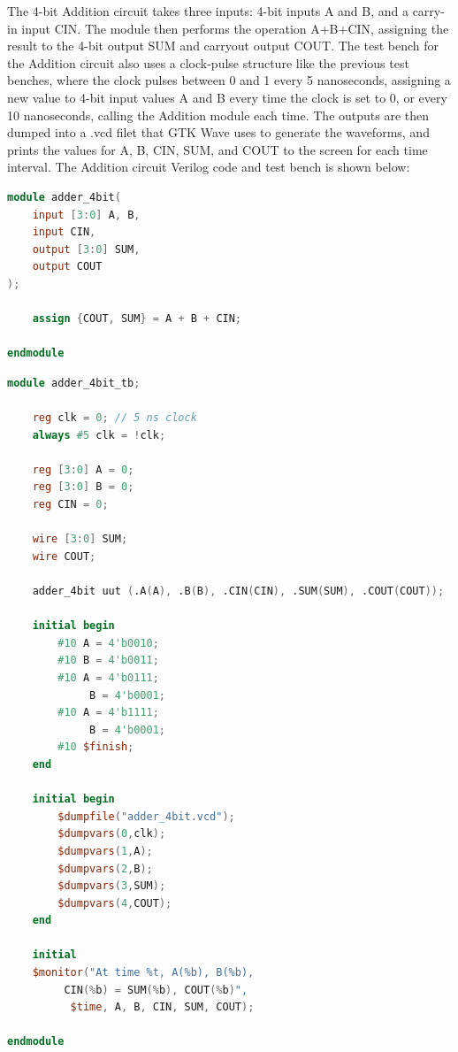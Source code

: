 \documentclass[runningheads, 12pt]{report}
\begin{document}
	The 4-bit Addition circuit takes three inputs: 4-bit inputs A and B, and a carry-in input CIN. The module then performs the operation A+B+CIN, assigning the result to the 4-bit output SUM and carryout output COUT.  The test bench for the Addition circuit also uses a clock-pulse structure like the previous test benches, where the clock pulses between 0 and 1 every 5 nanoseconds, assigning a new value to 4-bit input values A and B every time the clock is set to 0, or every 10 nanoseconds, calling the Addition module each time. The outputs are then dumped into a .vcd filet that GTK Wave uses to generate the waveforms, and prints the values for A, B, CIN, SUM, and COUT to the screen for each time interval. The Addition circuit Verilog code and test bench is shown below: 

\begin{lstlisting}[language=Verilog, caption={Addition Circuit Verilog}]
module adder_4bit(
    input [3:0] A, B,
    input CIN,
    output [3:0] SUM,
    output COUT
);

    assign {COUT, SUM} = A + B + CIN;

endmodule
\end{lstlisting}
	
\begin{lstlisting}[language=Verilog, caption={Addition Circuit Test Bench}]
module adder_4bit_tb;

    reg clk = 0; // 5 ns clock
    always #5 clk = !clk;

    reg [3:0] A = 0;
    reg [3:0] B = 0;
    reg CIN = 0;

    wire [3:0] SUM;
    wire COUT;

    adder_4bit uut (.A(A), .B(B), .CIN(CIN), .SUM(SUM), .COUT(COUT));

    initial begin
        #10 A = 4'b0010;
        #10 B = 4'b0011;
        #10 A = 4'b0111;
             B = 4'b0001;
        #10 A = 4'b1111;
             B = 4'b0001;
        #10 $finish;
    end

    initial begin
        $dumpfile("adder_4bit.vcd");
        $dumpvars(0,clk);
        $dumpvars(1,A);
        $dumpvars(2,B);
        $dumpvars(3,SUM);
        $dumpvars(4,COUT);
    end

    initial 
    $monitor("At time %t, A(%b), B(%b),
    	 CIN(%b) = SUM(%b), COUT(%b)", 
          $time, A, B, CIN, SUM, COUT);

endmodule
\end{lstlisting}

	
	
\end{document}
